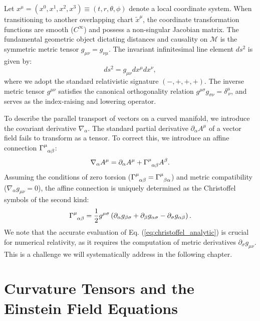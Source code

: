 \documentclass[11pt]{book}
\begin{document}
Let $x^\mu = (x^0, x^1, x^2, x^3) \equiv (t, r, \theta, \phi)$ denote a local coordinate system. When transitioning to another overlapping chart $\tilde{x}^\mu$, the coordinate transformation functions are smooth ($C^\infty$) and possess a non-singular Jacobian matrix. The fundamental geometric object dictating distances and causality on $\mathcal{M}$ is the symmetric metric tensor $g_{\mu\nu} = g_{\nu\mu}$. The invariant infinitesimal line element $ds^2$ is given by:
\begin{equation}
    ds^2 = g_{\mu\nu} dx^\mu dx^\nu,
\end{equation}
where we adopt the standard relativistic signature $(-, +, +, +)$. The inverse metric tensor $g^{\mu\nu}$ satisfies the canonical orthogonality relation $g^{\mu\sigma} g_{\sigma\nu} = \delta^\mu_{\ \nu}$, and serves as the index-raising and lowering operator.

To describe the parallel transport of vectors on a curved manifold, we introduce the covariant derivative $\nabla_\alpha$. The standard partial derivative $\partial_\alpha A^\mu$ of a vector field fails to transform as a tensor. To correct this, we introduce an affine connection $\tensor{\Gamma}{^\mu_\alpha_\beta}$:
\begin{equation}
    \nabla_\alpha A^\mu = \partial_\alpha A^\mu + \tensor{\Gamma}{^\mu_\alpha_\beta} A^\beta.
\end{equation}
Assuming the conditions of zero torsion ($\tensor{\Gamma}{^\mu_\alpha_\beta} = \tensor{\Gamma}{^\mu_\beta_\alpha}$) and metric compatibility ($\nabla_\alpha g_{\mu\nu} = 0$), the affine connection is uniquely determined as the Christoffel symbols of the second kind:
\begin{equation}\label{eq:christoffel_analytic}
    \tensor{\Gamma}{^\mu_\alpha_\beta} = \frac{1}{2} g^{\mu\sigma} \left( \partial_\alpha g_{\beta\sigma} + \partial_\beta g_{\alpha\sigma} - \partial_\sigma g_{\alpha\beta} \right).
\end{equation}
We note that the accurate evaluation of Eq. (\ref{eq:christoffel_analytic}) is crucial for numerical relativity, as it requires the computation of metric derivatives $\partial_\sigma g_{\mu\nu}$. This is a challenge we will systematically address in the following chapter.


\section{Curvature Tensors and the Einstein Field Equations}
\end{document}
